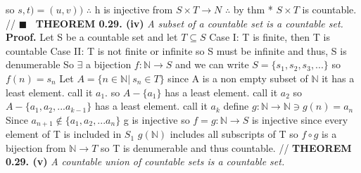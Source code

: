 \documentclass[12pt]{article}
\begin{document}
	so \(s,t) = (u,v))\) \newline
	\(\therefore\) h is injective from \(S \times T \rightarrow N\)
	\newline
	\(\therefore\) by thm * \(S \times T\) is countable. //
	\newline \(\blacksquare\) \newpage
	\(\ \) \newline
	\textbf{THEOREM 0.29. (iv)} \textit{A subset of a countable set is a countable set.} \newline \newline
	\textbf{Proof. } \newline
	Let S be a countable set and let \(T \subseteq S\) \newline
	Case I: T is finite, then T is countable \newline
	Case II: T is not finite or infinite \newline
	so S must be infinite and thus, S is denumerable \newline
	So \(\exists\) a bijection \(f:\mathbb{N}\rightarrow S\) and we can write \newline
	\(S=\{s_1,s_2,s_3,...\}\) so \(f(n)=s_n\) \newline
	Let \(A = \{n \in \mathbb{N}|\ s_n \in T\}\) \newline
	since A is a non empty subset of \(\mathbb{N}\)  it has a least element. call it \(a_1\). \newline
	so \(A-\{a_1\}\) has a least element. call it \(a_2\) \newline
	so \(A-\{a_1,a_2,...a_{k-1}\}\) has a least element. call it \(a_k\) \newline
	define \(g: \mathbb{N} \rightarrow \mathbb{N} \ni g(n) = a_n\) \newline
	Since \(a_{n+1} \notin \{a_1,a_2,...a_n\}\) g is injective \newline
	so \(f=g: \mathbb{N}\rightarrow S\) is injective \newline
	since every element of T is included in \(S_1\) \newline
	\(g(\mathbb{N})\) includes all subscripts of T \newline
	so \(f \circ g\) is a bijection from \(\mathbb{N}\rightarrow T\) \newline
	so T is denumerable and thus countable. //
	\newline \newline
	\textbf{THEOREM 0.29. (v)} \textit{A countable union of countable sets is a countable set.} \newline \newline
\end{document}
